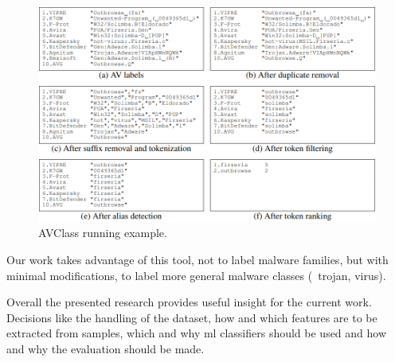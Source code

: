 \begin{figure}[!htb]
	\centering
	\includegraphics[width=\columnwidth]{Figures/avclass.png}
	\caption{AVClass running example.}
	\label{fig:avclass}
\end{figure}

Our work takes advantage of this tool, not to label malware families, but with minimal modifications, to label more general malware classes (\eg\ trojan, virus).

\medskip

Overall the presented research provides useful insight for the current work. Decisions like the handling of the dataset, how and which features are to be extracted from samples, which and why \gls{ml} classifiers should be used and how and why the evaluation should be made.
